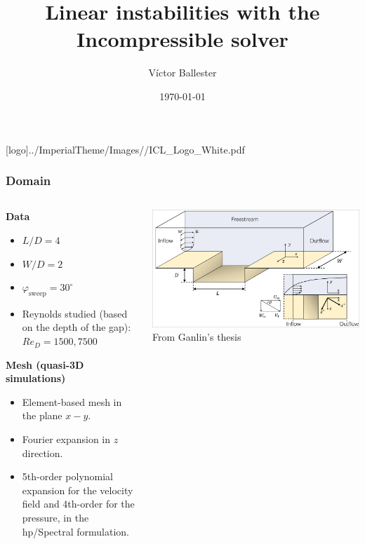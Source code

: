 \documentclass[
	aspectratio=169, %
	t, %
	onlytextwidth, %
	10pt, %
]{beamer}
\title{Linear instabilities with the Incompressible solver} %
\subtitle{} %
\author{Víctor Ballester} %
\date{\today} %
\def\imagefolder{../ImperialTheme/Images/}
\begin{document}
\begingroup
{} %
[logo]{\imagefolder/ICL_Logo_White.pdf} %
\frame[plain, s]{\titlepage} %
\endgroup

\begin{frame}
	\frametitle{Domain}

	\begin{columns}[T] %
		\begin{column}{0.48\linewidth} %
			\textbf{Data}
			\begin{itemize}
				\item $L/D = 4$
				\item $W/D = 2$
				\item $\varphi_\text{sweep} = 30^\circ$
				\item Reynolds studied (based on the depth of the gap): $Re_D = 1500,7500$
			\end{itemize}

			\textbf{Mesh (quasi-3D simulations)}
			\begin{itemize}
				\item Element-based mesh in the plane $x-y$.
				\item Fourier expansion in $z$ direction.
				\item 5th-order polynomial expansion for the velocity field and 4th-order for the pressure, in the hp/Spectral formulation.
			\end{itemize}
		\end{column}
		\begin{column}{0.48\linewidth} %
			\includegraphics[trim=0.2cm 0.5cm 0.1cm 0.1cm, clip, width=\linewidth]{Images/domain.png} %
			{\tiny\textcolor{ICLBlue}{From Ganlin's thesis}}
		\end{column}
	\end{columns}
\end{frame}
\end{document}
